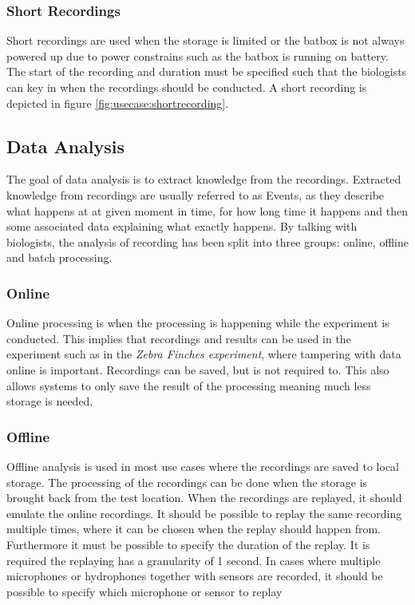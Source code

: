 \subsubsection{Short Recordings}\label{sec:usecase:shortrecording}
Short recordings are used when the storage is limited or the batbox is not always powered up due to power constrains such as the batbox is running on battery. The start of the recording and duration must be specified such that the biologists can key in when the recordings should be conducted.
A short recording is depicted in figure \ref{fig:usecase:shortrecording}.


\subsection{Data Analysis} \label{sec:dataanalysis}
The goal of data analysis is to extract knowledge from the recordings. Extracted knowledge from recordings are usually referred to as Events, as they describe what happens at at given moment in time, for how long time it happens and then some associated data explaining what exactly happens.
By talking with biologists, the analysis of recording has been split into three groups: online, offline and batch processing. 

\subsubsection{Online}\label{sec:usecase:online}
Online processing is when the processing is happening while the experiment is conducted. This implies that recordings and results can be used in the experiment such as in the \textit{Zebra Finches experiment}, where tampering with data online is important. Recordings can be saved, but is not required to. This also allows systems to only save the result of the processing meaning much less storage is needed.

\subsubsection{Offline}
Offline analysis is used in most use cases where the recordings are saved to local storage. The processing of the recordings can be done when the storage is brought back from the test location. When the recordings are replayed, it should emulate the online recordings.
It should be possible to replay the same recording multiple times, where it can be chosen when the replay should happen from. Furthermore it must be possible to specify the duration of the replay. It is required the replaying has a granularity of 1 second. In cases where multiple microphones or hydrophones together with sensors are recorded, it should be possible to specify which microphone or sensor to replay

